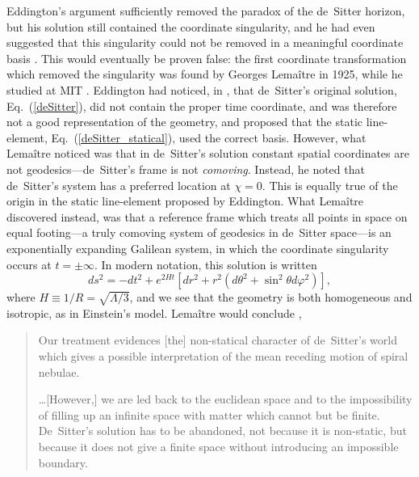 Eddington's argument sufficiently removed the paradox of the de~Sitter horizon, but his solution still contained the coordinate singularity, and he had even suggested that this singularity could not be removed in a meaningful coordinate basis \cite{Eddington1923}. This would eventually be proven false: the first coordinate transformation which removed the singularity was found by Georges Lema\^{i}tre in 1925, while he studied at MIT \cite{Lemaitre1925b}. Eddington had noticed, in \cite{Eddington1923}, that de~Sitter's original solution, Eq.~(\ref{deSitter}), did not contain the proper time coordinate, and was therefore not a good representation of the geometry, and proposed that the static line-element, Eq.~(\ref{deSitter_statical}), used the correct basis. However, what Lema\^{i}tre noticed was that in de~Sitter's solution constant spatial coordinates are not geodesics---de~Sitter's frame is not \textit{comoving}. Instead, he noted that de~Sitter's system has a preferred location at $\chi=0$. This is equally true of the origin in the static line-element proposed by Eddington. What Lema\^{i}tre discovered instead, was that a reference frame which treats all points in space on equal footing---a truly comoving system of geodesics in de~Sitter space---is an exponentially expanding Galilean system, in which the coordinate singularity occurs at $t=\pm\infty$. In modern notation, this solution is written
\begin{equation}
ds^2=-dt^2+e^{2Ht}[dr^2+r^2(d\theta^2+\sin^2\theta{d}\varphi^2)],\label{deSitter_comoving}
\end{equation}
where $H\equiv1/R=\sqrt{\Lambda/3}$, and we see that the geometry is both homogeneous and isotropic, as in Einstein's model. Lema\^{i}tre would conclude \cite{Lemaitre1925b},
\begin{quotation}
Our treatment evidences [the] non-statical character of de~Sitter's world which gives a possible interpretation of the mean receding motion of spiral nebulae.

\ldots[However,] we are led back to the euclidean space and to the impossibility of filling up an infinite space with matter which cannot but be finite. De~Sitter's solution has to be abandoned, not because it is non-static, but because it does not give a finite space without introducing an impossible boundary.
\end{quotation}

